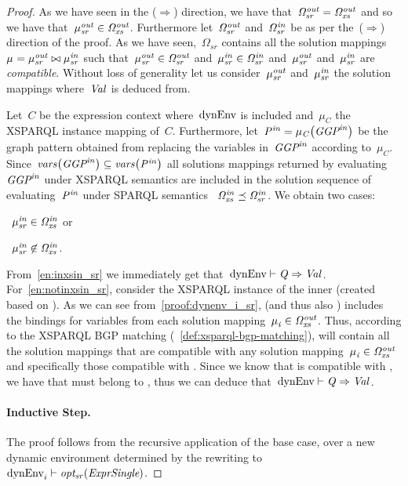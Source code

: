 \begin{proof}
  As we have seen in the ($\Rightarrow$) direction, we have that~${\mathit{\Omega}}_{\mathit{sr}}^{\mathit{out}} = {\mathit{\Omega}}_{\mathit{xs}}^{\mathit{out}}$ and so we have
  that~${\mathit{\mu}}_{\mathit{sr}}^{\mathit{out}} \in {\mathit{\Omega}}_{\mathit{xs}}^{\mathit{out}}$.
  Furthermore let~${\mathit{\Omega}}_{\mathit{sr}}^{\mathit{out}}$ and~${\mathit{\Omega}}_{\mathit{sr}}^{\mathit{in}}$ be as per the~($\Rightarrow$) direction of the proof.
  As we have seen,~$\Omega_{sr}$ contains all the solution mappings~${\mathit{\mu}}_{\mathit{}}^{\mathit{}} = {\mathit{\mu}}_{\mathit{sr}}^{\mathit{out}} \bowtie {\mathit{\mu}}_{\mathit{sr}}^{\mathit{in}}$ such
  that~${\mathit{\mu}}_{\mathit{sr}}^{\mathit{out}} \in {\mathit{\Omega}}_{\mathit{sr}}^{\mathit{out}}$ and~${\mathit{\mu}}_{\mathit{sr}}^{\mathit{in}} \in {\mathit{\Omega}}_{\mathit{sr}}^{\mathit{in}}$ and~${\mathit{\mu}}_{\mathit{sr}}^{\mathit{out}}$ and~${\mathit{\mu}}_{\mathit{sr}}^{\mathit{in}}$ are
  \emph{compatible}.
  Without loss of generality let us consider~${\mathit{\mu}}_{\mathit{sr}}^{\mathit{out}}$ and~${\mathit{\mu}}_{\mathit{sr}}^{\mathit{in}}$ the solution mappings
  where~$\mathit{{Val}_{}}$ is deduced from.


  Let~$C$ be the expression context where~${\textrm{dynEnv}}$ is included and~$\mu_C$ the XSPARQL instance mapping of~$C$.
  Furthermore, let~${\mathit{P}}_{\mathit{}}^{\mathit{in}} = \mathit{\mu_C}\!\left({\mathit{{\textit{GGP}}}}_{\mathit{}}^{\mathit{in}}\right)$ be the graph pattern obtained from
  replacing the variables in~${\mathit{{\textit{GGP}}}}_{\mathit{}}^{\mathit{in}}$ according to~$\mu_C$.
  Since~$\mathit{vars}\!\left({\mathit{{\textit{GGP}}}}_{\mathit{}}^{\mathit{in}}\right) \subseteq \mathit{vars}\!\left({\mathit{P}}_{\mathit{}}^{\mathit{in}}\right)$ all solutions mappings returned by
  evaluating~${\mathit{{\textit{GGP}}}}_{\mathit{}}^{\mathit{in}}$ under XSPARQL semantics are included in the solution sequence of
  evaluating~${\mathit{P}}_{\mathit{}}^{\mathit{in}}$ under SPARQL semantics \ie~${\mathit{\Omega}}_{\mathit{xs}}^{\mathit{in}} \preceq {\mathit{\Omega}}_{\mathit{sr}}^{\mathit{in}}$.
  We obtain two cases:
  \begin{inparaenum}[(i)]
  \item\label{en:inxsin_sr}~${\mathit{\mu}}_{\mathit{sr}}^{\mathit{in}} \in {\mathit{\Omega}}_{\mathit{xs}}^{\mathit{in}}$ or
  \item\label{en:notinxsin_sr}~${\mathit{\mu}}_{\mathit{sr}}^{\mathit{in}} \not\in {\mathit{\Omega}}_{\mathit{xs}}^{\mathit{in}}$.
  \end{inparaenum}
  From~\eqref{en:inxsin_sr} we immediately get that~${\textrm{dynEnv}} \vdash \mathit{{Q}_{}} \Rightarrow \mathit{{Val}_{}}$.
  For~\eqref{en:notinxsin_sr}, consider  the XSPARQL instance of the inner \SparqlForClause (created based
  on ). As we can see from~\eqref{proof:dynenv_i_sr},  (and thus also ) includes the
  bindings for variables from each solution mapping~${\mathit{\mu}}_{\mathit{i}}^{\mathit{}} \in {\mathit{\Omega}}_{\mathit{xs}}^{\mathit{out}}$.  Thus, according to the XSPARQL \ac{BGP}
  matching (\cf~\cref{def:xsparql-bgp-matching}),  will contain all the solution mappings that are
  compatible with any solution mapping~${\mathit{\mu}}_{\mathit{i}}^{\mathit{}} \in {\mathit{\Omega}}_{\mathit{xs}}^{\mathit{out}}$ and specifically those compatible with .
  Since we know that  is compatible with , we have that  must belong to ,
  thus we can deduce that~${\textrm{dynEnv}} \vdash \mathit{{Q}_{}} \Rightarrow \mathit{{Val}_{}}$.

  \paragraph*{Inductive Step.}
  The proof follows from the recursive application of the base case, over a new dynamic environment determined by the
   rewriting to $\mathrm{dynEnv}_{i}^{\mathit{}} \vdash \mathit{opt_{sr}}\!\left({\textit{Expr\-Single}}\right)$.
\end{proof}



